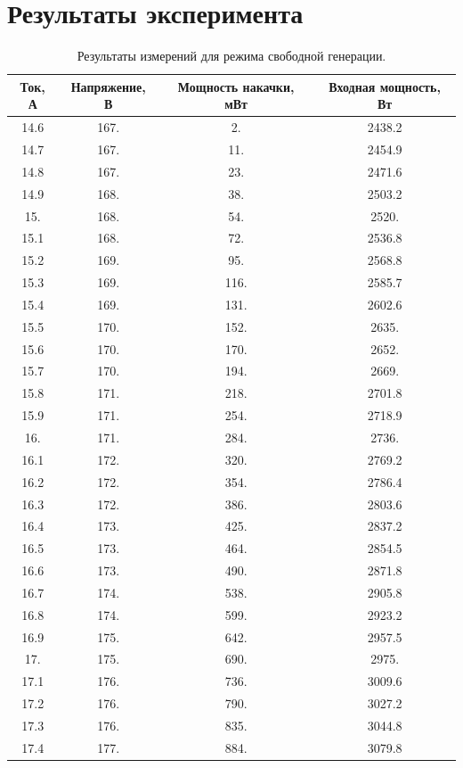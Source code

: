 \documentclass[a4paper, 12pt]{article}
\begin{document}
\section{Результаты эксперимента}
\begin{table}[!htb]
	\centering
	\caption{Результаты измерений для режима свободной генерации.}
	\begin{tabular}{|c|c|c|c|}
	\hline
	Ток, А & Напряжение, В & Мощность накачки, мВт & Входная мощность, Вт\\
	\hline
 14.6 & 167. & 2. & 2438.2\\
 14.7 & 167. & 11. & 2454.9\\
 14.8 & 167. & 23. & 2471.6\\
 14.9 & 168. & 38. & 2503.2\\
 15. & 168. & 54. & 2520.\\
 15.1 & 168. & 72. & 2536.8\\
 15.2 & 169. & 95. & 2568.8\\
 15.3 & 169. & 116. & 2585.7\\
 15.4 & 169. & 131. & 2602.6\\
 15.5 & 170. & 152. & 2635.\\
 15.6 & 170. & 170. & 2652.\\
 15.7 & 170. & 194. & 2669.\\
 15.8 & 171. & 218. & 2701.8\\
 15.9 & 171. & 254. & 2718.9\\
 16. & 171. & 284. & 2736.\\
 16.1 & 172. & 320. & 2769.2\\
 16.2 & 172. & 354. & 2786.4\\
 16.3 & 172. & 386. & 2803.6\\
 16.4 & 173. & 425. & 2837.2\\
 16.5 & 173. & 464. & 2854.5\\
 16.6 & 173. & 490. & 2871.8\\
 16.7 & 174. & 538. & 2905.8\\
 16.8 & 174. & 599. & 2923.2\\
 16.9 & 175. & 642. & 2957.5\\
 17. & 175. & 690. & 2975.\\
 17.1 & 176. & 736. & 3009.6\\
 17.2 & 176. & 790. & 3027.2\\
 17.3 & 176. & 835. & 3044.8\\
 17.4 & 177. & 884. & 3079.8\\
 \hline
	\end{tabular}
\end{table}
\end{document}
